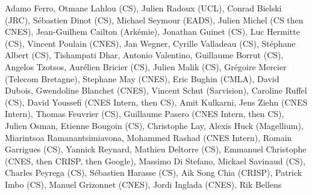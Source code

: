 Adamo Ferro, Otmane Lahlou (CS), Julien Radoux (UCL), Conrad Bielski (JRC), S\'ebastien Dinot (CS), Michael Seymour (EADS), Julien Michel (CS then CNES), Jean-Guilhem Cailton (Ark\'emie), Jonathan Guinet (CS), Luc Hermitte (CS), Vincent Poulain (CNES), Jan Wegner, Cyrille Valladeau (CS), St\'ephane Albert (CS), Tishampati Dhar, Antonio Valentino, Guillaume Borrut (CS), Angelos Tzotsos, Aur\'elien Bricier (CS), Julien Malik (CS), Gr\'egoire Mercier (Telecom Bretagne), Stephane May (CNES), Eric Bughin (CMLA), David Dubois, Gwendoline Blanchet (CNES), Vincent Schut (Sarvision), Caroline Ruffel (CS), David Youssefi  (CNES Intern, then CS), Amit Kulkarni, Jens Ziehn (CNES Intern), Thomas Feuvrier (CS), Guillaume Pasero (CNES Intern, then CS), Julien Osman, Etienne Bougoin (CS), Christophe Lay, Alexis Huck (Magellium), Miarintsoa Ramanantsimiavona, Mohammed Rashad (CNES Intern), Romain Garrigues (CS), Yannick Reynard, Mathieu Deltorre (CS), Emmanuel Christophe (CNES, then CRISP, then Google), Massimo Di Stefano, Mickael Savinaud (CS), Charles Peyrega (CS), S\'ebastien Harasse (CS), Aik Song Chia (CRISP), Patrick Imbo (CS), Manuel Grizonnet (CNES), Jordi Inglada (CNES), Rik Bellens